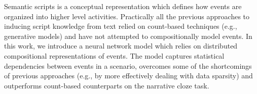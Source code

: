 Semantic scripts is a conceptual representation which defines how events are organized into higher level activities. Practically all the previous approaches to inducing script knowledge from text relied on count-based techniques (e.g., generative models) and have not attempted to compositionally model events. In this work, we introduce a neural network model which relies on distributed compositional representations of events. The model captures statistical dependencies between events in a scenario, overcomes some of the shortcomings of previous approaches (e.g., by more effectively dealing with data sparsity) and outperforms count-based counterparts on the narrative cloze task.
